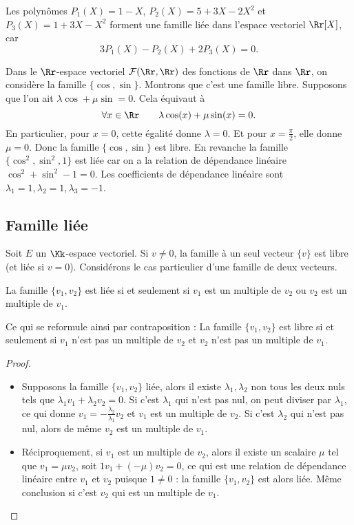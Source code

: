 \documentclass[class=report,crop=false]{standalone}
\begin{document}
\begin{exemple}
Les polyn\^omes $P_1(X)=1-X$, $P_2(X)=5+3X-2X^2$ et  $P_3(X)=1+3X-X^2$
forment une famille liée dans l'espace vectoriel $\Rr[X]$, car
$$3P_1(X) - P_2(X) + 2P_3(X) = 0.$$
\end{exemple}


\begin{exemple}
Dans le $\Rr$-espace vectoriel $\mathcal{F}(\Rr ,\Rr)$ des fonctions de $\Rr$
dans $\Rr$, on considère la famille $\{\cos, \sin\}$.
Montrons que c'est une famille libre.
Supposons que l'on ait $\lambda \cos+\mu \sin =0$. Cela équivaut à
$$\forall x \in \Rr \qquad \lambda \cos(x) + \mu \sin(x)=0.  $$
En particulier, pour $x=0$, cette égalité donne $\lambda =0$. Et pour
$x=\frac{\pi}2$, elle donne $\mu=0$. Donc la famille
$\{\cos , \sin\}$ est libre.
En revanche la famille $\{\cos^2, \sin^2,1\}$ est liée car on a
la relation de dépendance linéaire $\cos ^2 + \sin^2 -1 =0$.
Les coefficients de dépendance linéaire sont $\lambda_1=1, \lambda_2=1, \lambda_3=-1$.
\end{exemple}



\subsection{Famille liée}

Soit $E$ un $\Kk$-espace vectoriel.
Si $v\neq  0$, la famille à un seul vecteur $\{v\}$ est libre (et liée si $v= 0$).
Considérons le cas particulier d'une famille de deux vecteurs.
\begin{proposition}
La famille $\{ v_1, v_2\}$ est liée si
et seulement si $v_1$ est un multiple de $v_2$ ou
$v_2$ est un multiple de $v_1$.
\end{proposition}
Ce qui se reformule ainsi par contraposition :
\og La famille $\{ v_1, v_2\}$ est libre si
et seulement si $v_1$ n'est pas un multiple de $v_2$ et
$v_2$ n'est pas un multiple de $v_1$. \fg

\begin{proof}
~
\begin{itemize}
  \item Supposons la famille $\{ v_1, v_2\}$ liée, alors il existe
$\lambda_1,\lambda_2$ non tous les deux nuls tels que
$\lambda_1 v_1+\lambda_2 v_2= 0$. Si c'est $\lambda_1$ qui n'est
pas nul, on peut diviser par $\lambda_1$, ce qui donne
$ v_1=-\frac{\lambda_2}{\lambda_1} v_2$ et $ v_1$ est un multiple de $v_2$.
Si c'est $\lambda_2$ qui n'est pas nul, alors de même $v_2$ est un multiple de $ v_1$.

  \item Réciproquement, si $ v_1$ est un multiple de $ v_2$, alors il
existe un scalaire $\mu$ tel que $ v_1=\mu  v_2$, soit $1 v_1+(-\mu)
v_2= 0$, ce qui est une relation de dépendance linéaire entre $v_1$ et $ v_2$
puisque $1\neq 0$ : la famille $\{ v_1, v_2\}$ est alors liée.
Même conclusion si c'est $v_2$ qui est un multiple de $ v_1$.
\end{itemize}
\end{proof}
\end{document}
